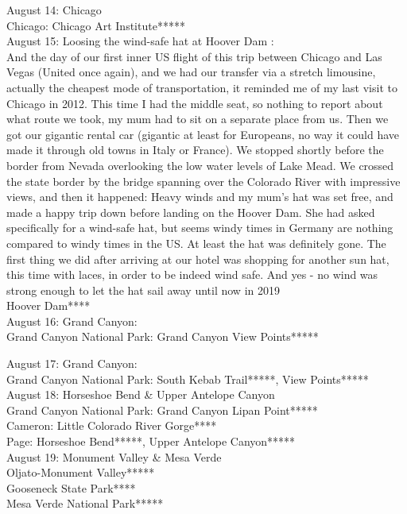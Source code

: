 August 14: Chicago\\
Chicago: Chicago Art Institute*****\\

August 15: Loosing the wind-safe hat at Hoover Dam : \\
And the day of our first inner US flight of this trip between Chicago and Las Vegas (United once again), and we had our transfer via a stretch limousine, actually the cheapest mode of transportation, it reminded me of my last visit to Chicago in 2012. This time I had the middle seat, so nothing to report about what route we took, my mum had to sit on a separate place from us. Then we got our gigantic rental car (gigantic at least for Europeans, no way it could have made it through old towns in Italy or France). We stopped shortly before the border from Nevada overlooking the low water levels of Lake Mead. We crossed the state border by the bridge spanning over the Colorado River with impressive views, and then it happened: Heavy winds and my mum's hat was set free, and made a happy trip down before landing on the Hoover Dam. She had asked specifically for a wind-safe hat, but seems windy times in Germany are nothing compared to windy times in the US. At least the hat was definitely gone. The first thing we did after arriving at our hotel was shopping for another sun hat, this time with laces, in order to be indeed wind safe. And yes - no wind was strong enough to let the hat sail away until now in 2019\\

Hoover Dam****\\

August 16: Grand Canyon:\\
Grand Canyon National Park: Grand Canyon View Points*****

August 17: Grand Canyon:\\
Grand Canyon National Park: South Kebab Trail*****, View Points*****\\

August 18: Horseshoe Bend \& Upper Antelope Canyon\\
Grand Canyon National Park: Grand Canyon Lipan Point*****\\
Cameron: Little Colorado River Gorge****\\
Page: Horseshoe Bend*****, Upper Antelope Canyon*****\\

August 19: Monument Valley \& Mesa Verde\\
Oljato-Monument Valley*****\\
Gooseneck State Park****\\
Mesa Verde National Park*****\\

